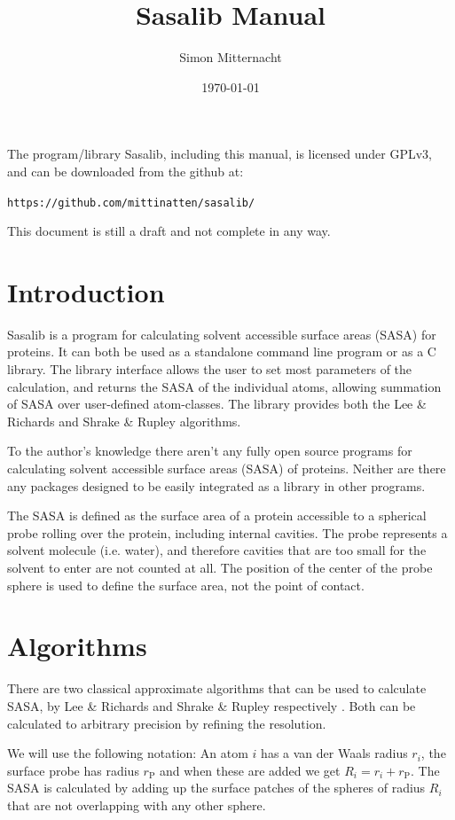 \documentclass[a4paper,11pt]{article}
\author{Simon Mitternacht}
\date{\today}
\title{Sasalib Manual}
\begin{document}
\maketitle
\noindent
The program/library Sasalib, including this manual, is licensed under
GPLv3, and can be downloaded from the github at: 
\begin{center}
\texttt{https://github.com/mittinatten/sasalib/}
\end{center}

This document is still a draft and not complete in any way.

\newpage
\section{Introduction}

Sasalib is a program for calculating solvent accessible surface areas
(SASA) for proteins. It can both be used as a standalone command line
program or as a C library. The library interface allows the user to
set most parameters of the calculation, and returns the SASA of the
individual atoms, allowing summation of SASA over user-defined
atom-classes. The library provides both the Lee \& Richards
\cite{LnR} and Shrake \& Rupley \cite{SnR} algorithms.

To the author's knowledge there aren't any fully open source programs for
calculating solvent accessible surface areas (SASA) of
proteins. Neither are there any packages designed to be easily
integrated as a library in other programs. 

The SASA is defined as the surface area of a protein accessible to a
spherical probe rolling over the protein, including internal
cavities. The probe represents a solvent molecule (i.e. water), and
therefore cavities that are too small for the solvent to enter are not
counted at all. The position of the center of the probe sphere is used
to define the surface area, not the point of contact.

\section{Algorithms}

There are two classical approximate algorithms that can be used to
calculate SASA, by Lee \& Richards \cite{LnR} and Shrake \& Rupley
respectively \cite{SnR}. Both can be calculated to arbitrary precision
by refining the resolution.

We will use the following notation: An atom $i$ has a van der Waals
radius $r_i$, the surface probe has radius $r_\text{P}$ and when these
are added we get $R_i = r_i + r_\text{P}$. The SASA is calculated by
adding up the surface patches of the spheres of radius $R_i$ that are
not overlapping with any other sphere.
\end{document}
